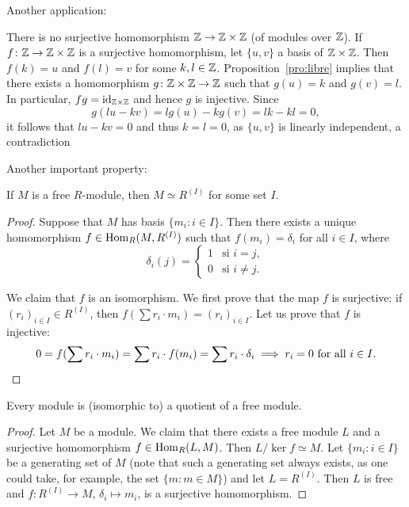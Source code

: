 Another application:

\begin{example}
There is no surjective homomorphism $\mathbb{Z}\to\mathbb{Z}\times\mathbb{Z}$ (of modules over $\mathbb{Z}$). 
If $f\colon\mathbb{Z}\to\mathbb{Z}\times\mathbb{Z}$ is a surjective homomorphism, 
let $\{u,v\}$ a basis of $\mathbb{Z}\times\mathbb{Z}$. Then $f(k)=u$ and $f(l)=v$ for some $k,l\in\mathbb{Z}$. Proposition~\ref{pro:libre} implies 
that there exists a homomorphism $g\colon\mathbb{Z}\times\mathbb{Z}\to\mathbb{Z}$ such that $g(u)=k$ and $g(v)=l$. 
In particular, $f g=\operatorname{id}_{\mathbb{Z}\times\mathbb{Z}}$ and hence 
$g$ is injective. Since  
\[
g(lu-kv)=lg(u)-kg(v)=lk-kl=0,
\]
it follows that $lu-kv=0$ and thus $k=l=0$, as $\{u,v\}$ is linearly independent, a contradiction
\end{example}

Another important property:

\begin{proposition}
If $M$ is a free $R$-module, then $M\simeq R^{(I)}$ for some set $I$.
\end{proposition}

\begin{proof}
Suppose that $M$ has basis $\{m_i:i\in I\}$. Then there exists a unique homomorphism
$f\in\operatorname{Hom}_R(M,R^{(I)})$ such that  
$f(m_i)=\delta_i$ for all $i\in I$, where 
\[
\delta_i(j)=\begin{cases}
	1 & \text{si $i=j$},\\
	0 & \text{si $i\ne j$.}
	\end{cases}	
\]	

We claim that $f$ is an isomorphism. We first prove that the map $f$ is surjective: if $(r_i)_{i\in I}\in R^{(I)}$, then
$f(\sum r_i\cdot m_i)=(r_i)_{i\in I}$. Let us prove that $f$ is injective: 
\[
0=f(\sum r_i\cdot m_i)=\sum r_i\cdot f(m_i)=\sum r_i\cdot\delta_i\implies r_i=0\text{ for all $i\in I$}.\qedhere
\]
\end{proof}

\begin{corollary}
Every module is (isomorphic to) a quotient of a free module.
\end{corollary}

\begin{proof}
Let $M$ be a module. We claim that there exists a free module $L$ and a surjective homomorphism $f\in\operatorname{Hom}_R(L,M)$. Then
$L/\ker f\simeq M$. Let $\{m_i:i\in I\}$
be a generating set of $M$ (note that such a generating set always exists, as one could take, for example, the set
$\{m:m\in M\}$) and let $L=R^{(I)}$. Then $L$ is free and $f\colon R^{(I)}\to M$, $\delta_i\mapsto m_i$, is a surjective 
homomorphism.
\end{proof}

